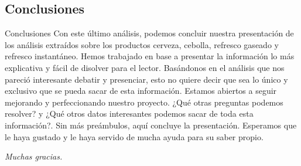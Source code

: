 \subsection{Conclusiones}
\begin{frame}[fragile]{Conclusiones}
  Con este último análisis, podemos concluir nuestra presentación de los análisis extraídos sobre los productos cerveza, cebolla, refresco gaseado y refresco instantáneo. 
  Hemos trabajado en base a presentar la información lo más explicativa y fácil de disolver para el lector. 
  Basándonos en el análisis que nos pareció interesante debatir y presenciar, esto no quiere decir que sea lo único y exclusivo que se pueda sacar de esta información. 
  Estamos abiertos a seguir mejorando y perfeccionando nuestro proyecto. 
  ¿Qué otras preguntas podemos resolver? y ¿Qué otros datos interesantes podemos sacar de toda esta información?. 
  Sin más preámbulos, aquí concluye la presentación. 
  Esperamos que le haya gustado y le haya servido de mucha ayuda para su saber propio.

  \begin{flushright}
    \textit{\LARGE Muchas gracias.}
  \end{flushright}
\end{frame}